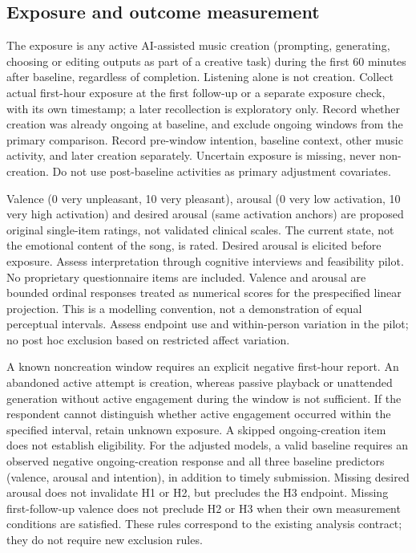 \documentclass[11pt]{article}
\begin{document}
\subsection{Exposure and outcome measurement}
\par The exposure is any active AI-assisted music creation (prompting, generating, choosing or editing outputs as part of a creative task) during the first 60 minutes after baseline, regardless of completion. Listening alone is not creation. Collect actual first-hour exposure at the first follow-up or a separate exposure check, with its own timestamp; a later recollection is exploratory only. Record whether creation was already ongoing at baseline, and exclude ongoing windows from the primary comparison. Record pre-window intention, baseline context, other music activity, and later creation separately. Uncertain exposure is missing, never non-creation. Do not use post-baseline activities as primary adjustment covariates.
\par Valence (0 very unpleasant, 10 very pleasant), arousal (0 very low activation, 10 very high activation) and desired arousal (same activation anchors) are proposed original single-item ratings, not validated clinical scales. The current state, not the emotional content of the song, is rated. Desired arousal is elicited before exposure. Assess interpretation through cognitive interviews and feasibility pilot. No proprietary questionnaire items are included. Valence and arousal are bounded ordinal responses treated as numerical scores for the prespecified linear projection. This is a modelling convention, not a demonstration of equal perceptual intervals. Assess endpoint use and within-person variation in the pilot; no post hoc exclusion based on restricted affect variation.

A known noncreation window requires an explicit negative first-hour report. An abandoned active attempt is creation, whereas passive playback or unattended generation without active engagement during the window is not sufficient. If the respondent cannot distinguish whether active engagement occurred within the specified interval, retain unknown exposure. A skipped ongoing-creation item does not establish eligibility. For the adjusted models, a valid baseline requires an observed negative ongoing-creation response and all three baseline predictors (valence, arousal and intention), in addition to timely submission. Missing desired arousal does not invalidate H1 or H2, but precludes the H3 endpoint. Missing first-follow-up valence does not preclude H2 or H3 when their own measurement conditions are satisfied. These rules correspond to the existing analysis contract; they do not require new exclusion rules.
\end{document}

